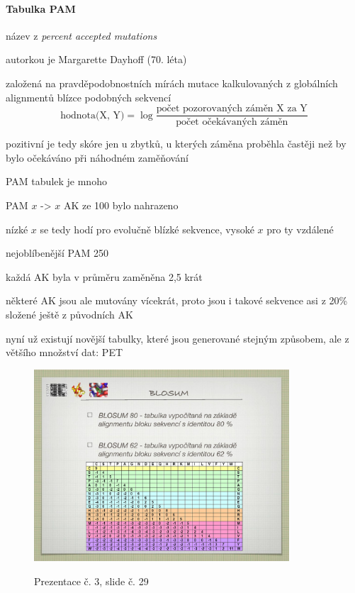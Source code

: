 \documentclass[DIV=8]{scrreprt}
\begin{document}
\paragraph{Tabulka PAM}
\begin{myItemize}[nosep]
    \item název z \emph{percent accepted mutations}
    \item autorkou je Margarette Dayhoff (70. léta)
    \item založená na pravděpodobnostních mírách mutace kalkulovaných z globálních alignmentů blízce podobných sekvencí
\[\text{hodnota(X, Y)} = \log \frac{\text{počet pozorovaných záměn X za Y}}{\text{počet očekávaných záměn}}\]
    \item pozitivní je tedy skóre jen u zbytků, u kterých záměna proběhla častěji než by bylo očekáváno při náhodném zaměňování
    \item PAM tabulek je mnoho
\begin{myItemize}[nosep]
    \item PAM \(x\) -> \(x\) AK ze 100 bylo nahrazeno
    \item nízké \(x\) se tedy hodí pro evolučně blízké sekvence, vysoké \(x\) pro ty vzdálené
    \item nejoblíbenější PAM 250
\begin{myItemize}[nosep]
    \item každá AK byla v průměru zaměněna 2,5 krát
    \item některé AK jsou ale mutovány vícekrát, proto jsou i takové sekvence asi z 20\% složené ještě z původních AK
\end{myItemize}

\end{myItemize}

    \item nyní už existují novější tabulky, které jsou generované stejným způsobem, ale z většího množství dat: PET
\end{myItemize}



\begin{figure}
    \caption{Prezentace č. 3, slide č. 29}
    \includegraphics[width=0.85\textwidth]{slides-3/slide-29.jpg}
    \centering
    \label{slides-3-slide-29}
\end{figure}
\end{document}
